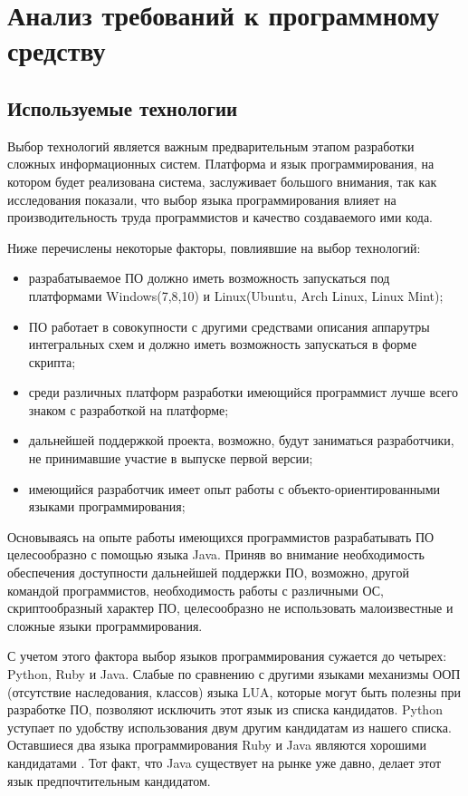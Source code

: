\lstset{style=fsharpstyle}

\section{Анализ требований к программному средству}

\subsection{Используемые технологии}
\label{sec:practice:technology_used}

Выбор технологий является важным предварительным этапом разработки сложных информационных систем.
Платформа и язык программирования, на котором будет реализована система, заслуживает большого внимания, так как исследования показали, что выбор языка программирования влияет на производительность труда программистов и качество создаваемого ими кода.

Ниже перечислены некоторые факторы, повлиявшие на выбор технологий:
\begin{itemize}
\item разрабатываемое ПО должно иметь возможность запускаться под платформами Windows(7,8,10) и Linux(Ubuntu, Arch Linux, Linux Mint);
\item ПО работает в совокупности с другими средствами описания аппарутры интегральных схем и должно иметь возможность запускаться в форме скрипта;
\item среди различных платформ разработки имеющийся программист лучше всего знаком с разработкой на платформе;
\item дальнейшей поддержкой проекта, возможно, будут заниматься разработчики, не принимавшие участие в выпуске первой версии;
\item имеющийся разработчик имеет опыт работы с объекто-ориентированными языками программирования;
\end{itemize}

Основываясь на опыте работы имеющихся программистов разрабатывать ПО целесообразно с помощью языка Java.
Приняв во внимание необходимость обеспечения доступности дальнейшей поддержки ПО, возможно, другой командой программистов, необходимость работы с различными ОС, скриптообразный характер ПО, целесообразно не использовать малоизвестные и сложные языки программирования.

С учетом этого фактора выбор языков программирования сужается до четырех: Python, Ruby и Java. Слабые по сравнению с другими языками механизмы ООП (отсутствие наследования, классов) языка LUA, которые могут быть полезны при разработке ПО, позволяют исключить этот язык из списка кандидатов. Python уступает по удобству использования двум другим кандидатам из нашего списка. Оставшиеся два языка программирования Ruby и Java являются хорошими кандидатами . Тот факт, что Java существует на рынке уже давно, делает этот язык предпочтительным кандидатом.

